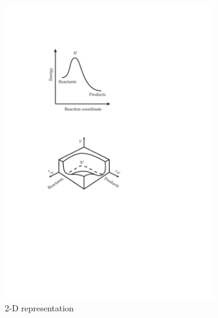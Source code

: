 \documentclass[preprint, 11pt]{elsarticle} %
\begin{document}
\begin{figure}[htbp]
\centering
\begin{subfigure}[t]{.5\textwidth}
  \centering
  \includegraphics{TST-2D-PES}
  \caption{2-D representation}
  \label{fig:sub1}
\end{subfigure}%
\begin{subfigure}[t]{.5\textwidth}
  \centering

\end{subfigure}
\end{figure}
\end{document}
